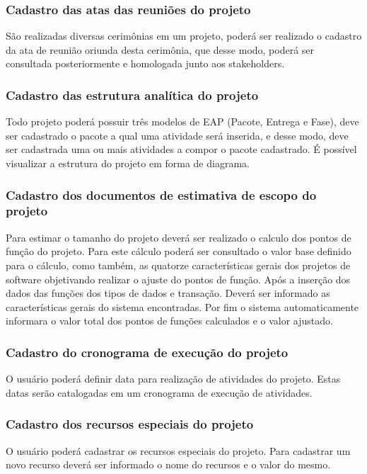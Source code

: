 \documentclass{acm_proc_article-sp}
\begin{document}
\subsubsection{Cadastro das atas das reuniões do projeto}
São realizadas diversas cerimônias em um projeto, poderá ser realizado o cadastro da ata de reunião oriunda desta cerimônia, que desse modo, poderá ser consultada posteriormente e homologada junto aos stakeholders.

\subsubsection{Cadastro das estrutura analítica do projeto}
Todo projeto poderá possuir três modelos de EAP (Pacote, Entrega e Fase), deve ser cadastrado o pacote a qual uma atividade será inserida, e desse modo, deve ser cadastrada uma ou mais atividades a compor o pacote cadastrado. É possível visualizar a estrutura do projeto em forma de diagrama. 

\subsubsection{Cadastro dos documentos de estimativa de escopo do projeto}
Para estimar o tamanho do projeto deverá ser realizado o calculo dos pontos de função do projeto. Para este cálculo poderá ser consultado o valor base definido para o cálculo, como também, as quatorze características gerais dos projetos de software objetivando realizar o ajuste do pontos de função. Após a inserção dos dados das funções dos tipos de dados e transação. Deverá ser informado as características gerais do sistema encontradas. Por fim o sistema automaticamente informara o valor total dos pontos de funções calculados e o valor ajustado.

\subsubsection{Cadastro do cronograma de execução do projeto}
O usuário poderá definir data para realização de atividades do projeto. Estas datas serão catalogadas em um cronograma de execução de atividades.

\subsubsection{Cadastro dos recursos especiais do projeto}
O usuário poderá cadastrar os recursos especiais do projeto. Para cadastrar um novo recurso deverá ser informado o nome do recursos e o valor do mesmo.
\end{document}
